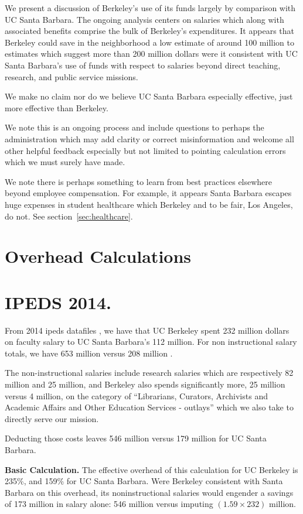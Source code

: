 \documentclass{article}
\title{}
\author{}
\begin{document}
We present a discussion of Berkeley's use of its funds largely by
comparison with UC Santa Barbara. The ongoing analysis centers on
salaries which along with associated benefits comprise the bulk of
Berkeley's expenditures.  It appears that Berkeley could save in the
neighborhood a low estimate of around 100 million to estimates which
suggest more than 200 million dollars were it consistent with UC Santa
Barbara's use of funds with respect to salaries beyond direct
teaching, research, and public service missions.

We make no claim nor do we believe UC Santa Barbara especially
effective, just more effective than Berkeley. 

We note this is an ongoing process and include questions to perhaps
the administration which may add clarity or correct misinformation
and welcome all other helpful feedback especially but not limited
to pointing calculation errors which we must surely have made.

We note there is perhaps something to learn from best practices
elsewhere beyond employee compensation. For example, it appears
Santa Barbara escapes huge expenses in student healthcare
which Berkeley and to be fair, Los Angeles, do not. See
section~\ref{sec:healthcare}.

\section{Overhead Calculations}

\section{IPEDS 2014.}

From 2014 ipeds datafiles \cite{ipeds-is}, we have that UC
Berkeley spent 232 million dollars on faculty salary to UC Santa
Barbara's 112 million.  For non instructional salary totals,
we have 653 million versus 208 million \cite{ipeds-nis}. 

The non-instructional salaries include research salaries which are
respectively 82 million and 25 million, and Berkeley also spends
significantly more, 25 million versus 4 million, on the category of
``Librarians, Curators, Archivists and Academic Affairs and Other
Education Services - outlays'' which we also take to directly serve
our mission.  

Deducting those costs leaves 546 million versus 179 million for 
UC Santa Barbara. 

{\bf Basic Calculation.} The effective overhead of this calculation for UC Berkeley is 235\%,
and 159\% for UC Santa Barbara.  Were Berkeley consistent with Santa
Barbara on this overhead, its noninstructional salaries would engender
a savings of 173 million in salary alone: 546 million versus imputing
$(1.59 \times 232)$ million. 
\end{document}
